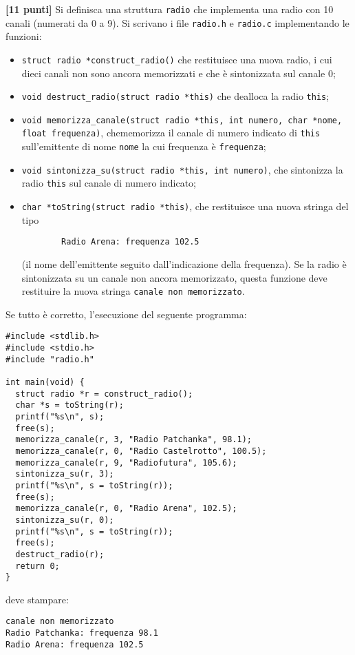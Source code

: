 \documentclass{article}[10pt]
\newcounter{esnu}
\newenvironment{esercizio}{\medskip \noindent {\bf Esercizio\addtocounter{esnu}{1} \arabic{esnu}}}{}
\begin{document}
\begin{esercizio}
\textbf{[11 punti]}
%
Si definisca una struttura \texttt{radio} che implementa una radio con 10 canali
(numerati da 0 a 9). Si scrivano i file \texttt{radio.h} e \texttt{radio.c} implementando
le funzioni:
%
\begin{itemize}
\item \texttt{struct radio *construct\_radio()} che restituisce una nuova radio,
      i cui dieci canali non sono ancora memorizzati e che \`e sintonizzata sul canale 0;
\item \texttt{void destruct\_radio(struct radio *this)} che dealloca la radio \texttt{this};
\item \texttt{void memorizza\_canale(struct radio *this, int numero, char *nome, float frequenza)},
      che\linebreak memorizza il canale di numero indicato di \texttt{this} sull'emittente di nome
      \texttt{nome} la cui frequenza \`e \texttt{frequenza};
\item \texttt{void sintonizza\_su(struct radio *this, int numero)}, che sintonizza la radio
      \texttt{this} sul canale di numero indicato;
\item \texttt{char *toString(struct radio *this)}, che restituisce una nuova stringa del
      tipo
      \begin{verbatim}
        Radio Arena: frequenza 102.5
      \end{verbatim}
      (il nome dell'emittente seguito dall'indicazione
      della frequenza). Se la radio \`e sintonizzata su un canale non ancora memorizzato,
      questa funzione deve restituire la nuova stringa \texttt{canale non memorizzato}.
\end{itemize}
%
Se tutto \`e corretto, l'esecuzione del seguente programma:

{\small
\begin{verbatim}
#include <stdlib.h>
#include <stdio.h>
#include "radio.h"

int main(void) {
  struct radio *r = construct_radio();
  char *s = toString(r);
  printf("%s\n", s);
  free(s);
  memorizza_canale(r, 3, "Radio Patchanka", 98.1);
  memorizza_canale(r, 0, "Radio Castelrotto", 100.5);
  memorizza_canale(r, 9, "Radiofutura", 105.6);
  sintonizza_su(r, 3);
  printf("%s\n", s = toString(r));
  free(s);
  memorizza_canale(r, 0, "Radio Arena", 102.5);
  sintonizza_su(r, 0);
  printf("%s\n", s = toString(r));
  free(s);
  destruct_radio(r);
  return 0;
}
\end{verbatim}}

\noindent
deve stampare:

{\small
\begin{verbatim}
canale non memorizzato
Radio Patchanka: frequenza 98.1
Radio Arena: frequenza 102.5
\end{verbatim}}

\end{esercizio}
%
\end{document}
